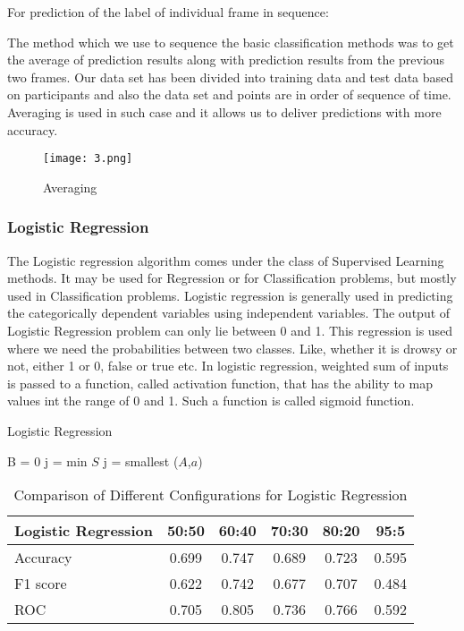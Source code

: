 \documentclass{article}
\begin{document}
For prediction of  the label of individual frame in sequence:

The method which we use to sequence the basic classification methods was to get the average of prediction results along with prediction results from the previous two frames. Our data set has been divided into training data and test data based on  participants and also the data set and points are  in order of sequence of time. Averaging is used in such case and it allows us to deliver predictions with more accuracy.

\begin{figure}[H]
\centering
\texttt{[image: 3.png]}
\caption {Averaging}
\label{fig-name}
\end{figure}

 \subsubsection{Logistic Regression}
The Logistic regression algorithm comes under the class of Supervised Learning methods. It may be used for Regression or for Classification problems, but mostly used in Classification problems. Logistic regression is generally used in predicting the categorically dependent variables using independent variables. The output of Logistic Regression problem can only lie between 0 and 1. This regression is used where we need the probabilities between two classes. Like, whether it is drowsy or not, either 1 or 0, false or true etc. In logistic regression, weighted sum of inputs is passed to a function, called activation function, that has the ability to map values int the range of 0 and 1. Such a function is called sigmoid function.

\begin{algorithm}[!h] %
\caption{Logistic Regression} %
\label{algo1}
\begin{algorithmic}[1]
\State B = 0
\EndFor j = {min} {$S$}
\State j = {smallest} {($A$,$a$)} 

\EndProcedure
\end{algorithmic}
\end{algorithm}




\begin{table}[!h]
\centering
\begin{tabular}{|l|c|c|c|c|c|}
\hline
\textbf{Logistic Regression} &  \textbf{50:50} &  \textbf{60:40} &  \textbf{70:30} &  \textbf{80:20} &  \textbf{95:5} \\
\hline
Accuracy & 0.699 & 0.747 & 0.689 & 0.723 & 0.595 \\
\hline
F1 score & 0.622 & 0.742 & 0.677 & 0.707 & 0.484 \\
\hline
ROC & 0.705 & 0.805 & 0.736 & 0.766 & 0.592 \\
\hline


\end{tabular}
\caption{Comparison of Different Configurations for Logistic Regression}

\label{tbl:dataset}
\end{table}
\end{document}

